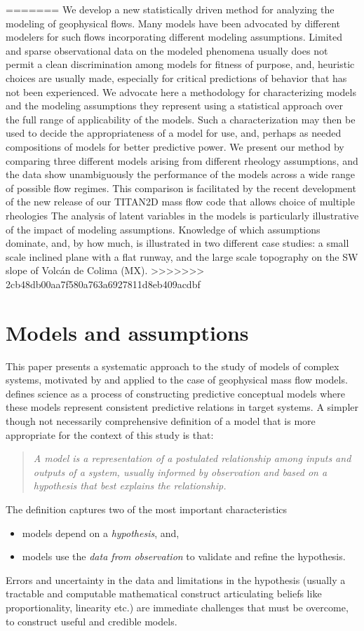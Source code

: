\documentclass{article}
\begin{document}
=======
We develop a new statistically driven method for analyzing the modeling of geophysical flows. Many models have been advocated by different modelers for such flows incorporating different modeling assumptions. Limited and sparse observational data on the modeled phenomena usually does not permit a clean discrimination among models for fitness of purpose, and, heuristic choices are usually made, especially for critical predictions of behavior that has not been experienced. We advocate here a methodology for characterizing models and the modeling assumptions they represent using a statistical approach over the full range of applicability of the models. Such a characterization may then be used to decide the appropriateness of a model for use, and, perhaps as needed  compositions of models for better predictive power. We present our method by comparing three different models arising from different rheology assumptions, and the data show unambiguously the performance of the models across a wide range of possible flow regimes. This comparison is facilitated by the recent development of the new release of our TITAN2D mass flow code that allows choice of multiple rheologies The analysis of latent variables in the models is particularly illustrative of the impact of modeling assumptions. Knowledge of which assumptions dominate, and, by how much, is illustrated in two different case studies: a small scale inclined plane with a flat runway, and the large scale topography on the SW slope of Volc\'{a}n de Colima (MX).
>>>>>>> 2cb48db00aa7f580a763a6927811d8eb409acdbf

\tableofcontents

\newpage
\section{Models and assumptions}
This paper presents a systematic approach to the study of models of complex systems, motivated by and applied to the case of geophysical mass flow models.
\citep{Gilbert91} defines science as a process of constructing predictive conceptual models where these models represent
consistent predictive relations in target systems. A simpler though not necessarily comprehensive definition of a model that is more appropriate for the context of this study is that:

\begin{quote}{\it A model is a representation of a postulated relationship among inputs and outputs of a system, usually informed by observation and based on a hypothesis that best explains the relationship.}\end{quote} The definition captures two of the most important characteristics
\begin{itemize}
\item models depend on a {\it hypothesis}, and,
\item models use the {\it data from observation} to validate and refine the hypothesis.
\end{itemize}
Errors and uncertainty in the data and limitations in the hypothesis (usually a tractable and computable mathematical construct articulating beliefs like proportionality, linearity etc.) are immediate challenges that must be overcome, to construct useful and credible models.
\end{document}
